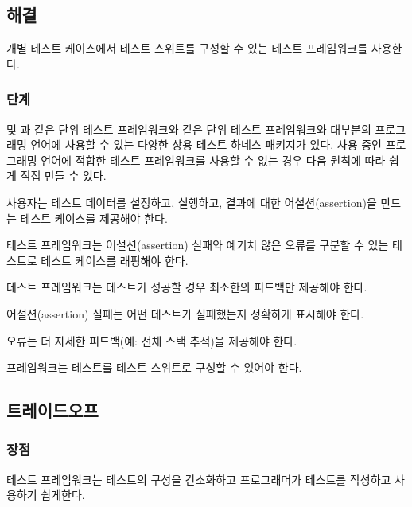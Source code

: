 \documentclass[a4paper,10pt,twoside]{book}
\begin{document}
\subsection*{해결}

개별 테스트 케이스에서 테스트 스위트를 구성할 수 있는 테스트 프레임워크를 사용한다.

\subsubsection*{단계}

 및 과 같은 단위 테스트 프레임워크\cite{Beck98a}와 같은 단위 테스트 프레임워크와 대부분의 프로그래밍 언어에 사용할 수 있는 다양한 상용 테스트 하네스 패키지가 있다. 사용 중인 프로그래밍 언어에 적합한 테스트 프레임워크를 사용할 수 없는 경우 다음 원칙에 따라 쉽게 직접 만들 수 있다.

\begin{bulletlist}
\item 사용자는 테스트 데이터를 설정하고, 실행하고, 결과에 대한 어설션(assertion)을 만드는 테스트 케이스를 제공해야 한다.
\item 테스트 프레임워크는 어설션(assertion) 실패와 예기치 않은 오류를 구분할 수 있는 테스트로 테스트 케이스를 래핑해야 한다.
\item 테스트 프레임워크는 테스트가 성공할 경우 최소한의 피드백만 제공해야 한다.

\begin{bulletlist}
\item 어설션(assertion) 실패는 어떤 테스트가 실패했는지 정확하게 표시해야 한다.

\item 오류는 더 자세한 피드백(예: 전체 스택 추적)을 제공해야 한다.
\end{bulletlist}

\item 프레임워크는 테스트를 테스트 스위트로 구성할 수 있어야 한다.
\end{bulletlist}

\subsection*{트레이드오프}

\subsubsection*{장점}

\begin{bulletlist}
\item 테스트 프레임워크는 테스트의 구성을 간소화하고 프로그래머가 테스트를 작성하고 사용하기 쉽게한다.
\end{bulletlist}
\end{document}
